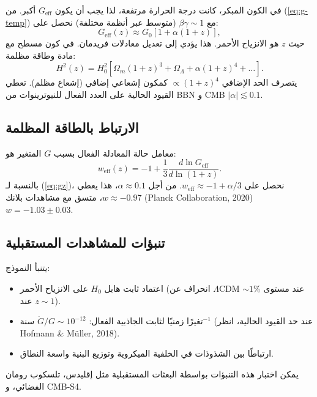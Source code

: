 \documentclass[11pt,a4paper]{article}
\begin{document}
	في الكون المبكر، كانت درجة الحرارة مرتفعة، لذا يجب أن يكون $G_{\text{eff}}$ أكبر. من (\ref{eq:g-temp}) مع $\beta\gamma \sim 1$ (متوسط عبر أنظمة مختلفة) نحصل على:
	\begin{equation}
		G_{\text{eff}}(z) \approx G_0 \left[ 1 + \alpha (1+z) \right],
		\label{eq:gz}
	\end{equation}
	حيث $z$ هو الانزياح الأحمر. هذا يؤدي إلى تعديل معادلات فريدمان. في كون مسطح مع مادة وطاقة مظلمة:
	\begin{equation}
		H^2(z) = H_0^2 \left[ \Omega_m (1+z)^3 + \Omega_\Lambda + \alpha (1+z)^4 + \dots \right].
		\label{eq:friedmann}
	\end{equation}
	يتصرف الحد الإضافي $\propto (1+z)^4$ كمكون إشعاعي إضافي (إشعاع مظلم). تعطي القيود الحالية على العدد الفعال للنيوترينوات من BBN و CMB $|\alpha| \lesssim 0.1$.
	
	\subsection{الارتباط بالطاقة المظلمة}
	\label{subsec:cosmo-de}
	
	معامل حالة المعادلة الفعال بسبب $G$ المتغير هو:
	\begin{equation}
		w_{\text{eff}}(z) = -1 + \frac{1}{3} \frac{d \ln G_{\text{eff}}}{d \ln(1+z)}.
		\label{eq:weff}
	\end{equation}
	بالنسبة لـ (\ref{eq:gz})، نحصل على $w_{\text{eff}} \approx -1 + \alpha/3$. من أجل $\alpha \approx 0.1$، هذا يعطي $w \approx -0.97$، متسق مع مشاهدات بلانك (Planck Collaboration, 2020) $w = -1.03 \pm 0.03$.
	
	\subsection{تنبؤات للمشاهدات المستقبلية}
	\label{subsec:cosmo-predictions}
	
	يتنبأ النموذج:
	\begin{itemize}
		\item اعتماد ثابت هابل $H_0$ على الانزياح الأحمر (انحراف عن $\Lambda$CDM عند مستوى $\sim 1\%$ عند $z\sim 1$).
		\item تغيرًا زمنيًا لثابت الجاذبية الفعال: $\dot{G}/G \sim 10^{-12}$ سنة$^{-1}$ (عند حد القيود الحالية، انظر Hofmann \& Müller, 2018).
		\item ارتباطًا بين الشذوذات في الخلفية الميكروية وتوزيع البنية واسعة النطاق.
	\end{itemize}
	يمكن اختبار هذه التنبؤات بواسطة البعثات المستقبلية مثل إقليدس، تلسكوب رومان الفضائي، و CMB-S4.
	
\end{document}
